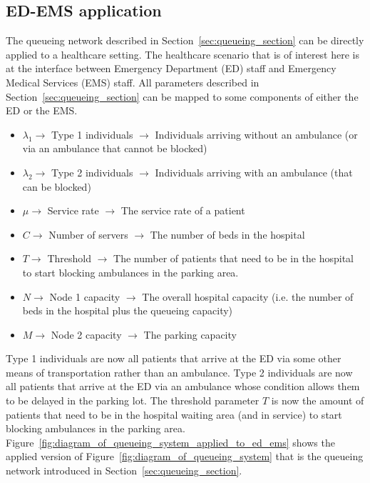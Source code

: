 \subsection{ED-EMS application}\label{sec:queueing_ems_es_application}

The queueing network described in Section~\ref{sec:queueing_section} can be
directly applied to a healthcare setting.
The healthcare scenario that is of interest here is at the interface between
Emergency Department (ED) staff and Emergency Medical Services (EMS) staff.
All parameters described in Section~\ref{sec:queueing_section} can be mapped
to some components of either the ED or the EMS.

\begin{itemize}
    \item \(\lambda_1 \rightarrow\) Type 1 individuals \(\rightarrow\)
    Individuals arriving without an ambulance (or via an ambulance that cannot
    be blocked)
    \item \(\lambda_2 \rightarrow\) Type 2 individuals \(\rightarrow\)
    Individuals arriving with an ambulance (that can be blocked)
    \item \(\mu \rightarrow\) Service rate \(\rightarrow\) The service rate of a patient
    \item \(C \rightarrow\) Number of servers \(\rightarrow\) The number of
    beds in the hospital
    \item \(T \rightarrow\) Threshold \(\rightarrow\) The number of patients that
    need to be in the hospital to start blocking ambulances in the parking area.
    \item \(N \rightarrow\) Node 1 capacity \(\rightarrow\) The overall hospital
    capacity (i.e. the number of beds in the hospital plus the queueing capacity)
    \item \(M \rightarrow\) Node 2 capacity \(\rightarrow\) The parking capacity
\end{itemize}

Type 1 individuals are now all patients that arrive at the ED via
some other means of transportation rather than an ambulance.
Type 2 individuals are now all patients that arrive at the ED via an ambulance whose condition allows them to be delayed in the parking lot.
The threshold parameter \(T\) is now the amount of patients that need to be in
the hospital waiting area (and in service) to start blocking ambulances in the
parking area.
Figure~\ref{fig:diagram_of_queueing_system_applied_to_ed_ems} shows the applied
version of Figure~\ref{fig:diagram_of_queueing_system} that is the queueing
network introduced in Section~\ref{sec:queueing_section}.

